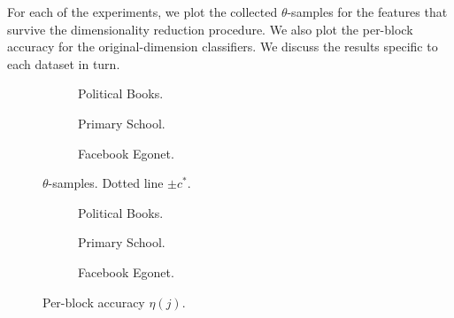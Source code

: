 For each of the experiments, we plot the collected $\theta$-samples for the features that survive the dimensionality reduction procedure. We also plot the per-block accuracy for the original-dimension classifiers. We discuss the results specific to each dataset in turn.

\begin{figure}
	\centering
	\begin{minipage}{0.42\linewidth}
		\centering
		\begin{subfigure}{\linewidth}
			\centering
			\caption{Political Books.}
			\label{fig:polbooks-null}
		\end{subfigure}
		
		\begin{subfigure}{\linewidth}
			\centering
			\caption{Primary School.}
			\label{fig:school-null}
		\end{subfigure}
		
		\begin{subfigure}{\linewidth}
			\centering
			\caption{Facebook Egonet.}
			\label{fig:fb-null}
		\end{subfigure}
		\caption{$\theta$-samples. Dotted line $\pm c^*$.}
	\end{minipage}
	\begin{minipage}{0.42\linewidth}
		\centering
		\begin{subfigure}[t]{\linewidth}
			\centering
			\caption{Political Books.}
			\label{fig:polbooks-accuracy}
		\end{subfigure}
		
		\begin{subfigure}{\linewidth}
			\centering
			\caption{Primary School.}
			\label{fig:school-accuracy}
		\end{subfigure}
		
		\begin{subfigure}{\linewidth}
			\centering
			\caption{Facebook Egonet.}
			\label{fig:fb-accuracy}
		\end{subfigure}
		\caption{Per-block accuracy $\eta(j)$.}
	\end{minipage}
\end{figure}


